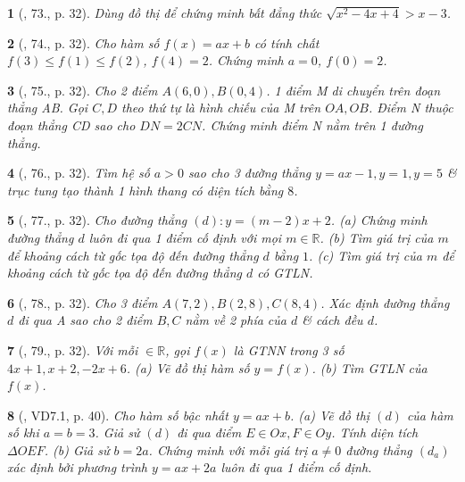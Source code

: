 \documentclass{article}
\newtheorem{baitoan}{}
\begin{document}
\begin{baitoan}[\cite{Binh_Toan_9_tap_1}, 73., p. 32]
	Dùng đồ thị để chứng minh bất đẳng thức $\sqrt{x^2 - 4x + 4} > x - 3$.
\end{baitoan}

\begin{baitoan}[\cite{Binh_Toan_9_tap_1}, 74., p. 32]
	Cho hàm số $f(x) = ax + b$ có tính chất $f(3)\le f(1)\le f(2)$, $f(4) = 2$. Chứng minh $a = 0$, $f(0) = 2$.
\end{baitoan}

\begin{baitoan}[\cite{Binh_Toan_9_tap_1}, 75., p. 32]
	Cho 2 điểm $A(6,0),B(0,4)$. 1 điểm M di chuyển trên đoạn thẳng AB. Gọi $C,D$ theo thứ tự là hình chiếu của M trên $OA,OB$. Điểm N thuộc đoạn thẳng CD sao cho $DN = 2CN$. Chứng minh điểm N nằm trên 1 đường thẳng.
\end{baitoan}

\begin{baitoan}[\cite{Binh_Toan_9_tap_1}, 76., p. 32]
	Tìm hệ số $a > 0$ sao cho 3 đường thẳng $y = ax - 1,y = 1,y = 5$ \& trục tung tạo thành 1 hình thang có diện tích bằng $8$.
\end{baitoan}

\begin{baitoan}[\cite{Binh_Toan_9_tap_1}, 77., p. 32]
	Cho đường thẳng $(d):y = (m - 2)x + 2$. (a) Chứng minh đường thẳng $d$ luôn đi qua 1 điểm cố định với mọi $m\in\mathbb{R}$. (b) Tìm giá trị của $m$ để khoảng cách từ gốc tọa độ đến đường thẳng $d$ bằng $1$. (c) Tìm giá trị của $m$ để khoảng cách từ gốc tọa độ đến đường thẳng $d$ có {\rm GTLN}.
\end{baitoan}

\begin{baitoan}[\cite{Binh_Toan_9_tap_1}, 78., p. 32]
	Cho 3 điểm $A(7,2),B(2,8),C(8,4)$. Xác định đường thẳng $d$ đi qua A sao cho 2 điểm $B,C$ nằm về 2 phía của $d$ \& cách đều $d$.
\end{baitoan}

\begin{baitoan}[\cite{Binh_Toan_9_tap_1}, 79., p. 32]
	Với mỗi $\in\mathbb{R}$, gọi $f(x)$ là {\rm GTNN} trong 3 số $4x + 1,x + 2,-2x + 6$. (a) Vẽ đồ thị hàm số $y = f(x)$. (b) Tìm {\rm GTLN} của $f(x)$.
\end{baitoan}

\begin{baitoan}[\cite{TLCT_THCS_Toan_9_dai_so}, VD7.1, p. 40]
	Cho hàm số bậc nhất $y = ax + b$. (a) Vẽ đồ thị $(d)$ của hàm số khi $a = b = 3$. Giả sử $(d)$ đi qua điểm $E\in Ox,F\in Oy$. Tính diện tích $\Delta OEF$. (b) Giả sử $b = 2a$. Chứng minh với mỗi giá trị $a\ne0$ đường thẳng $(d_a)$ xác định bởi phương trình $y = ax + 2a$ luôn đi qua 1 điểm cố định.
\end{baitoan}
\end{document}

